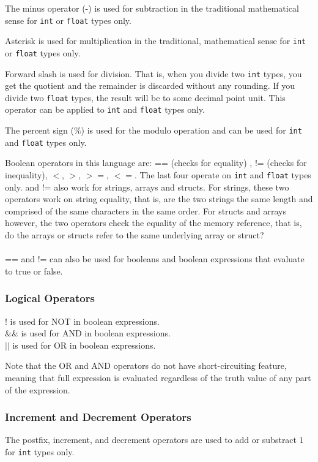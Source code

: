 \documentclass[12pt]{article}
\begin{document}
The minus operator (-) is used for subtraction in the traditional mathematical sense for \lstinline!int! or \lstinline!float! types only.

Asterisk is used for multiplication in the traditional, mathematical sense for \lstinline!int! or \lstinline!float! types only. 

Forward slash is used for division. That is, when you divide two \lstinline!int! types, you get the quotient and the remainder is discarded without any rounding. If you divide two \lstinline!float! types, the result will be to some decimal point unit. This operator can be applied to \lstinline!int! and \lstinline!float! types only. 

The percent sign ($\%$) is used for the modulo operation and can be used for \lstinline!int! and \lstinline!float! types only.

Boolean operators in this language are: == (checks for equality) , != (checks for inequality), $<$, $>$, $>=$, $<=$. The last four operate on \lstinline!int! and \lstinline!float! types only. and != also work for strings, arrays and structs. For strings, these two operators work on string equality, that is, are the two strings the same length and comprised of the same characters in the same order. For structs and arrays however, the two operators check the equality of the memory reference, that is, do the arrays or structs refer to the same underlying array or struct? \\
\\
== and != can also be used for booleans and boolean expressions that evaluate to true or false.

\subsubsection{Logical Operators}
$!$ is used for NOT in boolean expressions. \\
\&\& is used for AND in boolean expressions. \\
$||$ is used for OR in boolean expressions.

Note that the OR and AND operators do not have short-circuiting feature, meaning that full expression is evaluated regardless of the truth value of any part of the expression.

\subsubsection{Increment and Decrement Operators}
The postfix, increment, and decrement operators are used to add or substract $1$ for \lstinline!int! types only. 
\end{document}
